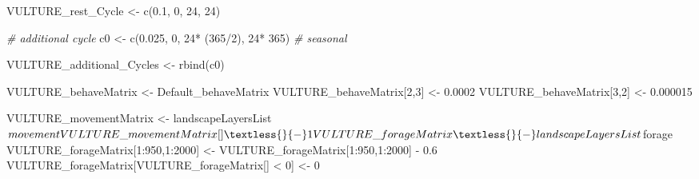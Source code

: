 \documentclass[10pt,a4paper]{article}
\newenvironment{Shaded}{}{}
\newcommand{\CommentTok}[1]{\textit{#1}}
\newcommand{\DecValTok}[1]{#1}
\newcommand{\FloatTok}[1]{#1}
\newcommand{\FunctionTok}[1]{#1}
\newcommand{\NormalTok}[1]{#1}
\newcommand{\OtherTok}[1]{#1}
\newcommand{\SpecialCharTok}[1]{#1}
\begin{document}
\begin{Shaded}
\begin{Highlighting}[]
\NormalTok{VULTURE\_rest\_Cycle }\OtherTok{\textless{}{-}} \FunctionTok{c}\NormalTok{(}\FloatTok{0.1}\NormalTok{, }\DecValTok{0}\NormalTok{, }\DecValTok{24}\NormalTok{, }\DecValTok{24}\NormalTok{)}

\CommentTok{\# additional cycle}
\NormalTok{c0 }\OtherTok{\textless{}{-}} \FunctionTok{c}\NormalTok{(}\FloatTok{0.025}\NormalTok{, }\DecValTok{0}\NormalTok{, }\DecValTok{24}\SpecialCharTok{*}\NormalTok{ (}\DecValTok{365}\SpecialCharTok{/}\DecValTok{2}\NormalTok{), }\DecValTok{24}\SpecialCharTok{*} \DecValTok{365}\NormalTok{) }\CommentTok{\# seasonal}

\NormalTok{VULTURE\_additional\_Cycles }\OtherTok{\textless{}{-}} \FunctionTok{rbind}\NormalTok{(c0)}

\NormalTok{VULTURE\_behaveMatrix }\OtherTok{\textless{}{-}}\NormalTok{ Default\_behaveMatrix}
\NormalTok{VULTURE\_behaveMatrix[}\DecValTok{2}\NormalTok{,}\DecValTok{3}\NormalTok{] }\OtherTok{\textless{}{-}} \FloatTok{0.0002}
\NormalTok{VULTURE\_behaveMatrix[}\DecValTok{3}\NormalTok{,}\DecValTok{2}\NormalTok{] }\OtherTok{\textless{}{-}} \FloatTok{0.000015}


\NormalTok{VULTURE\_movementMatrix }\OtherTok{\textless{}{-}}\NormalTok{ landscapeLayersList}\SpecialCharTok{$}\NormalTok{movement}
\NormalTok{VULTURE\_movementMatrix[] }\OtherTok{\textless{}{-}} \DecValTok{1}


\NormalTok{VULTURE\_forageMatrix }\OtherTok{\textless{}{-}}\NormalTok{ landscapeLayersList}\SpecialCharTok{$}\NormalTok{forage}
\NormalTok{VULTURE\_forageMatrix[}\DecValTok{1}\SpecialCharTok{:}\DecValTok{950}\NormalTok{,}\DecValTok{1}\SpecialCharTok{:}\DecValTok{2000}\NormalTok{] }\OtherTok{\textless{}{-}}\NormalTok{ VULTURE\_forageMatrix[}\DecValTok{1}\SpecialCharTok{:}\DecValTok{950}\NormalTok{,}\DecValTok{1}\SpecialCharTok{:}\DecValTok{2000}\NormalTok{] }\SpecialCharTok{{-}} \FloatTok{0.6}
\NormalTok{VULTURE\_forageMatrix[VULTURE\_forageMatrix[] }\SpecialCharTok{\textless{}} \DecValTok{0}\NormalTok{] }\OtherTok{\textless{}{-}} \DecValTok{0}
\end{Highlighting}
\end{Shaded}
\end{document}
